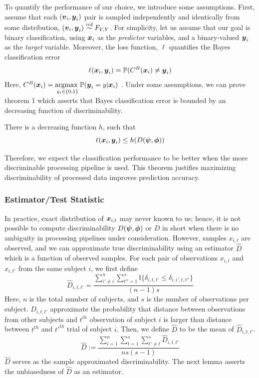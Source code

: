 \documentclass{article}
\begin{document}
To quantify the performance of our choice, we introduce some assumptions.  First, assume that each $(\boldsymbol{v}_i,\boldsymbol{y}_i)$ pair is sampled independently and identically from some distribution, $(\boldsymbol{v}_i,\boldsymbol{y}_i) \overset{iid}{\sim} F_{V,Y}$.  For simplicity, let us assume that our goal is binary classification, using $\boldsymbol{x}_i$ as the \emph{predictor} variables, and a binary-valued $\boldsymbol{y}_i$ as the \emph{target} variable. Moreover, the loss function, $\ell$ quantifies the Bayes classification error
\[\ell( \boldsymbol{x}_i, \boldsymbol{y}_i) =  \mathbb{P}(C^{B}(\boldsymbol{x}_i) \neq \boldsymbol{y}_i)\]
 Here, $C^{B}(\boldsymbol{x}_i)= \underset{y_i \in \{0,1\} }{\text{argmax }} \mathbb{P}(\boldsymbol{y}_i=y|\boldsymbol{x}_i) $ . Under some assumptions, we can prove theorem 1 which asserts that Bayes classification error is bounded by an decreasing function of discriminability. 
\begin{thm}	
	There is a decreasing function $h$, such that
\[\ell( \boldsymbol{x}_i, \boldsymbol{y}_i) \leq h(D(\boldsymbol{\psi},\boldsymbol{\phi})) \]
\end{thm}

Therefore, we expect the classification performance to be better when the more discriminable processing pipeline is used. This theorem justifies
maximizing discriminability of processed data improves prediction accuracy.

\subsubsection{Estimator/Test Statistic}
In practice, exact distribution of $\boldsymbol{x}_{i,t}$ may never known to us; hence, it is not possible to compute discriminability $D(\boldsymbol{\psi},\boldsymbol{\phi})$ or $D$ in short when there is no ambiguity in processing pipelines under consideration. However, samples $x_{i,t}$ are observed, and we can approximate true discriminability using an estimator $\hat{D}$ which is a function of observed samples. For each pair of observations $x_{i,t}$ and $x_{i,t'}$ from the same subject $i$, we first define
\[ \hat{D}_{i,t,t'} = \frac{\sum\limits_{i' \neq i}^{n} \sum\limits_{t''=1}^{s} \mathbb{I}\{\delta_{i,t,t'} \leq \delta_{i,i',t,t''} \} }{(n-1)s}\]
Here, $n$ is the total number of subjects, and $s$ is the number of observations per subject. $\hat{D}_{i,t,t'}$ approximate the probability that distance between observations from other subjects and $t^{th}$ observation of subject $i$ is larger than distance between $t^{th}$ and $t'^{th}$ trial of subject $i$. Then, we define $\hat{D}$ to be the mean of $\hat{D}_{i,t,t'}$.
\[ \hat{D} := \frac{\sum\limits_{i=1}^{n} \sum\limits_{t=1}^{s}  \sum\limits_{t' \neq t}^{s} \hat{D}_{i,t,t'}}{ns(s-1)} \]
$\hat{D}$ serves as the sample approximated discriminability. The next lemma asserts the unbiasedness of $\hat{D}$ as an estimator.
\end{document}
